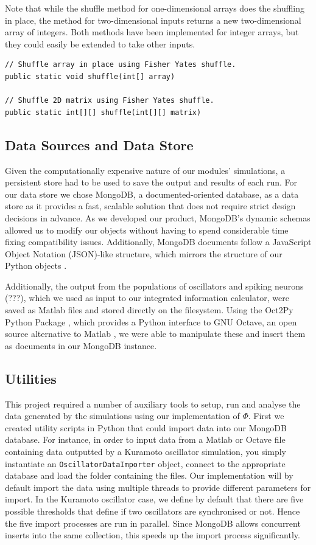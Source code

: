 \documentclass[a4paper,11pt]{article}
\begin{document}
Note that while the shuffle method for one-dimensional arrays does the shuffling in place, the method for two-dimensional inputs returns a new two-dimensional array of integers. Both methods have been implemented for integer arrays, but they could easily be extended to take other inputs. 

\begin{verbatim}
// Shuffle array in place using Fisher Yates shuffle.
public static void shuffle(int[] array)

// Shuffle 2D matrix using Fisher Yates shuffle.
public static int[][] shuffle(int[][] matrix)
\end{verbatim}

\subsection{Data Sources and Data Store}

Given the computationally expensive nature of our modules' simulations, a persistent store had to be used to save the output and results of each run. For our data store we chose MongoDB, a documented-oriented database, as a data store as it provides a fast, scalable solution that does not require strict design decisions in advance. As we developed our product, MongoDB's dynamic schemas allowed us to modify our objects without having to spend considerable time fixing compatibility issues. Additionally, MongoDB documents follow a JavaScript Object Notation (JSON)-like structure, which mirrors the structure of our Python objects \cite{MongoDB}.

Additionally, the output from the populations of oscillators and spiking neurons (???), which we used as input to our integrated information calculator, were saved as Matlab files and stored directly on the filesystem. Using the Oct2Py Python Package \cite{Silvester}, which provides a Python interface to GNU Octave, an open source alternative to Matlab \cite{Eaton}, we were able to manipulate these and insert them as documents in our MongoDB instance.

\subsection{Utilities}
\label{sec:utils}
This project required a number of auxiliary tools to setup, run and analyse the data generated by the simulations using our implementation of $\Phi$. First we created utility scripts in Python that could import data into our MongoDB database. For instance, in order to input data from a Matlab or Octave file containing data outputted by a Kuramoto oscillator simulation, you simply instantiate an \texttt{OscillatorDataImporter} object, connect to the appropriate database and load the folder containing the files. Our implementation will by default import the data using multiple threads to provide different parameters for import. In the Kuramoto oscillator case, we define by default that there are five possible thresholds that define if two oscillators are synchronised or not. Hence the five import processes are run in parallel. Since MongoDB allows concurrent inserts into the same collection, this speeds up the import process significantly.
\end{document}
